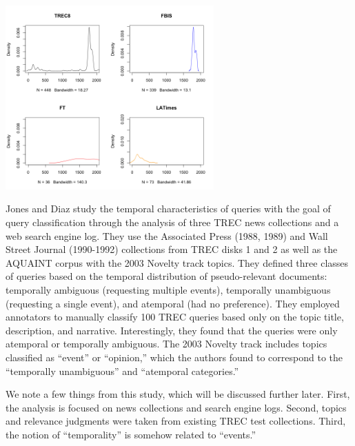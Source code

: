 \documentclass{sig-alternate}
\begin{document}
\includegraphics[width=8cm]{images/301.png}

Jones and Diaz \cite{Jones2007} study the temporal characteristics of queries with the goal of query classification through the analysis of three TREC news collections and a web search engine log. They use the Associated Press (1988, 1989) and Wall Street Journal (1990-1992) collections from TREC disks 1 and 2 as well as the AQUAINT corpus with the 2003 Novelty track topics. They defined three classes of queries based on the temporal distribution of pseudo-relevant documents: temporally ambiguous (requesting multiple events),  temporally unambiguous (requesting a single event), and atemporal (had no preference). They employed annotators to  manually classify 100 TREC queries based only on the topic title, description, and narrative.  Interestingly, they found that the queries were only atemporal or temporally ambiguous.  The 2003 Novelty track includes topics classified as ``event'' or ``opinion,'' which the authors found to correspond to the ``temporally unambiguous'' and ``atemporal categories.''  

We note a few things from this study, which will be discussed further later. First, the analysis is focused on news collections and search engine logs. Second, topics and relevance judgments were taken from existing TREC test collections.  Third, the notion of ``temporality'' is somehow related to ``events.'' 
\end{document}
